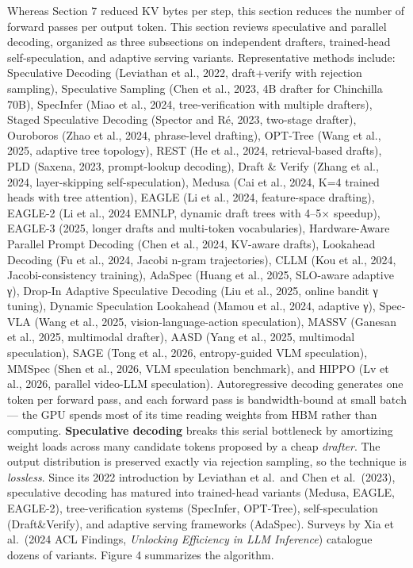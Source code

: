 Whereas Section 7 reduced KV bytes per step, this section reduces the number of forward passes per output token. This section reviews speculative and parallel decoding, organized as three subsections on independent drafters, trained-head self-speculation, and adaptive serving variants. Representative methods include: Speculative Decoding (Leviathan et al., 2022, draft+verify with rejection sampling), Speculative Sampling (Chen et al., 2023, 4B drafter for Chinchilla 70B), SpecInfer (Miao et al., 2024, tree-verification with multiple drafters), Staged Speculative Decoding (Spector and Ré, 2023, two-stage drafter), Ouroboros (Zhao et al., 2024, phrase-level drafting), OPT-Tree (Wang et al., 2025, adaptive tree topology), REST (He et al., 2024, retrieval-based drafts), PLD (Saxena, 2023, prompt-lookup decoding), Draft \& Verify (Zhang et al., 2024, layer-skipping self-speculation), Medusa (Cai et al., 2024, K=4 trained heads with tree attention), EAGLE (Li et al., 2024, feature-space drafting), EAGLE-2 (Li et al., 2024 EMNLP, dynamic draft trees with 4--5× speedup), EAGLE-3 (2025, longer drafts and multi-token vocabularies), Hardware-Aware Parallel Prompt Decoding (Chen et al., 2024, KV-aware drafts), Lookahead Decoding (Fu et al., 2024, Jacobi n-gram trajectories), CLLM (Kou et al., 2024, Jacobi-consistency training), AdaSpec (Huang et al., 2025, SLO-aware adaptive γ), Drop-In Adaptive Speculative Decoding (Liu et al., 2025, online bandit γ tuning), Dynamic Speculation Lookahead (Mamou et al., 2024, adaptive γ), Spec-VLA (Wang et al., 2025, vision-language-action speculation), MASSV (Ganesan et al., 2025, multimodal drafter), AASD (Yang et al., 2025, multimodal speculation), SAGE (Tong et al., 2026, entropy-guided VLM speculation), MMSpec (Shen et al., 2026, VLM speculation benchmark), and HIPPO (Lv et al., 2026, parallel video-LLM speculation). Autoregressive decoding generates one token per forward pass, and each forward pass is bandwidth-bound at small batch --- the GPU spends most of its time reading weights from HBM rather than computing. \textbf{Speculative decoding} breaks this serial bottleneck by amortizing weight loads across many candidate tokens proposed by a cheap \emph{drafter}. The output distribution is preserved exactly via rejection sampling, so the technique is \emph{lossless}. Since its 2022 introduction by Leviathan et al.~and Chen et al.~(2023), speculative decoding has matured into trained-head variants (Medusa, EAGLE, EAGLE-2), tree-verification systems (SpecInfer, OPT-Tree), self-speculation (Draft\&Verify), and adaptive serving frameworks (AdaSpec). Surveys by Xia et al.~(2024 ACL Findings, \emph{Unlocking Efficiency in LLM Inference}) catalogue dozens of variants. Figure 4 summarizes the algorithm.

